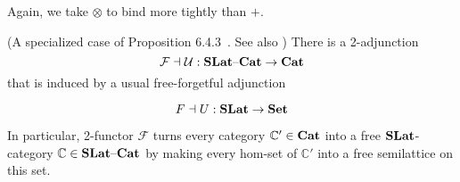 Again, we take $\otimes$ to bind more tightly than $+$.


\begin{proposition}(A specialized case of Proposition 6.4.3~\cite{Borceux_1994}. See also )
There is a 2-adjunction 
\vspace{-1mm}
\[
\mathcal{F} \dashv \mathcal{U} : \catname{SLat}\text{--}\catname{Cat} \to \catname{Cat}
\vspace{-1mm}
\]
that is induced by a usual free-forgetful adjunction 

\vspace{-1mm}
\[
F \dashv U : \catname{SLat} \to \catname{Set}
\vspace{-1mm}
\]
\end{proposition}
In particular, 2-functor $\mathcal{F}$ turns every category $\mathbb{C'} \in \mathbf{Cat}$ into a free $\mathbf{SLat}$-category $\mathbb{C} \in \mathbf{SLat}\text{--}\mathbf{Cat}$ by making every hom-set of $\mathbb{C'}$ into a free semilattice on this set.
